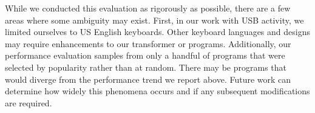 While we conducted this evaluation as rigorously as possible,
there are a few areas where some ambiguity may exist.
First, in our work with USB activity, we limited ourselves to US English
keyboards.  Other keyboard languages and designs may require enhancements to our transformer or programs.  Additionally, our performance evaluation samples from only a handful
of programs that were selected by popularity rather than at random.
There may be programs that would diverge from the performance trend we report above. Future work can determine how widely this phenomena occurs and if any subsequent modifications are required.


